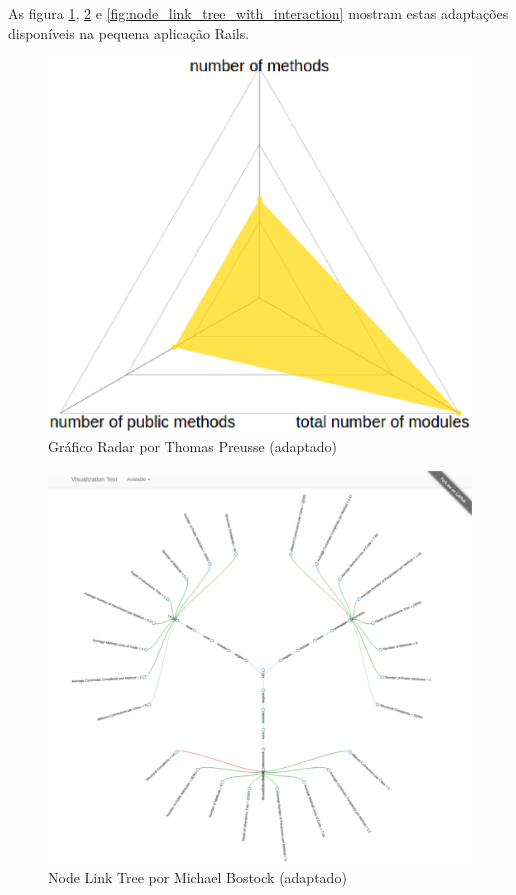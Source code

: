 As figura \ref{fig:radar}, \ref{fig:node_link_tree} e
\ref{fig:node_link_tree_with_interaction} mostram estas adaptações disponíveis
na pequena aplicação Rails.

\begin{figure}[!htb]
	\centering
    \includegraphics[keepaspectratio=true,scale=0.5]
    {figuras/radar.eps}
  \caption{Gráfico Radar por Thomas Preusse (adaptado)}
  \label{fig:radar}
\end{figure}

\begin{figure}[!htb]
	\centering
    \includegraphics[keepaspectratio=true,scale=0.15]
    {figuras/node_link_tree.eps}
  \caption{Node Link Tree por Michael Bostock (adaptado)}
  \label{fig:node_link_tree}
\end{figure}

